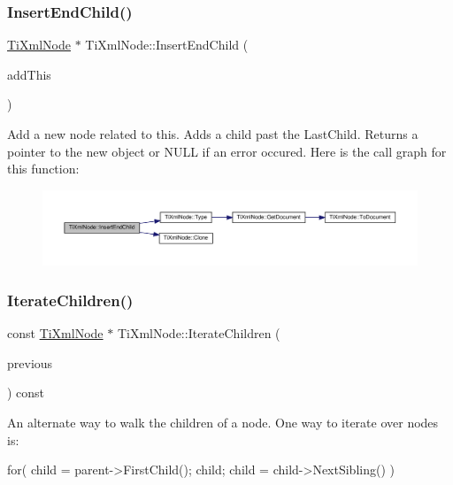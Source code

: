 \subsubsection{\texorpdfstring{Insert\+End\+Child()}{InsertEndChild()}}
{\footnotesize\ttfamily \hyperlink{classTiXmlNode}{Ti\+Xml\+Node} $\ast$ Ti\+Xml\+Node\+::\+Insert\+End\+Child (\begin{DoxyParamCaption}\item[{const \hyperlink{classTiXmlNode}{Ti\+Xml\+Node} \&}]{add\+This }\end{DoxyParamCaption})}

Add a new node related to this. Adds a child past the Last\+Child. Returns a pointer to the new object or N\+U\+LL if an error occured. Here is the call graph for this function\+:
\nopagebreak
\begin{figure}[H]
\begin{center}
\leavevmode
\includegraphics[width=350pt]{classTiXmlNode_af287a913ce46d8dbf7ef24fec69bbaf0_cgraph}
\end{center}
\end{figure}
\mbox{\label{classTiXmlNode_a67c3a02b797f08d9a31b2553661257e1}} 
\subsubsection{\texorpdfstring{Iterate\+Children()}{IterateChildren()}}
{\footnotesize\ttfamily const \hyperlink{classTiXmlNode}{Ti\+Xml\+Node} $\ast$ Ti\+Xml\+Node\+::\+Iterate\+Children (\begin{DoxyParamCaption}\item[{const \hyperlink{classTiXmlNode}{Ti\+Xml\+Node} $\ast$}]{previous }\end{DoxyParamCaption}) const}

An alternate way to walk the children of a node. One way to iterate over nodes is\+: \begin{DoxyVerb}    for( child = parent->FirstChild(); child; child = child->NextSibling() )
\end{DoxyVerb}


